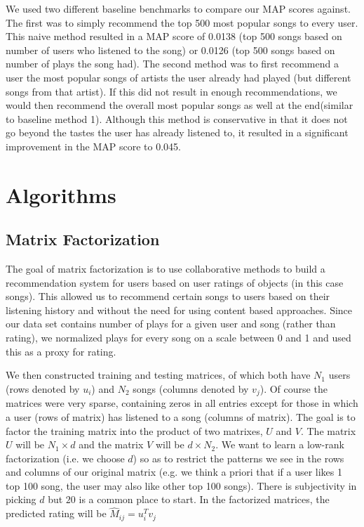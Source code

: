 \documentclass[12pt,preprint]{aastex}
\newcommand{\TRANSPOSE}{\ensuremath{T}}
\begin{document}
We used two different baseline benchmarks to compare our MAP scores against. The first was to simply recommend the top 500 most popular songs to every user. This naive method resulted in a MAP score of 0.0138 (top 500 songs based on number of users who listened to the song) or 0.0126 (top 500 songs based on number of plays the song had). The second method was to first recommend a user the most popular songs of artists the user already had played (but different songs from that artist). If this did not result in enough recommendations, we would then recommend the overall most popular songs as well at the end(similar to baseline method 1). Although this method is conservative in that it does not go beyond the tastes the user has already listened to, it resulted in a significant improvement in the MAP score to 0.045.




\section{Algorithms}

\subsection{Matrix Factorization}
The goal of matrix factorization is to use collaborative methods to build a recommendation system for users based on user ratings of objects (in this case songs). This allowed us to recommend certain songs to users based on their listening history and without the need for using content based approaches. Since our data set contains number of plays for a given user and song (rather than rating), we normalized plays for every song on a scale between 0 and 1 and used this as a proxy for rating. 

We then constructed training and testing matrices, of which both have $N_1$ users (rows denoted by $u_i$) and $N_2$ songs (columns denoted by $v_j$). Of course the matrices were very sparse, containing zeros in all entries except for those in which a user (rows of matrix) has listened to a song (columns of matrix). The goal is to factor the training matrix into the product of two matrixes, $U$ and $V$. The matrix $U$ will be $N_1 \times d$ and the matrix $V$ will be $d \times N_2$. We want to learn a low-rank factorization (i.e. we choose $d$) so as to restrict the patterns we see in the rows and columns of our original matrix (e.g. we think a priori that if a user likes 1 top 100 song, the user may also like other top 100 songs). There is subjectivity in picking $d$ but $20$ is a common place to start. In the factorized matrices, the predicted rating will be $\hat{M}_{ij} = u_i^\TRANSPOSE  v_j$ 
\end{document}
